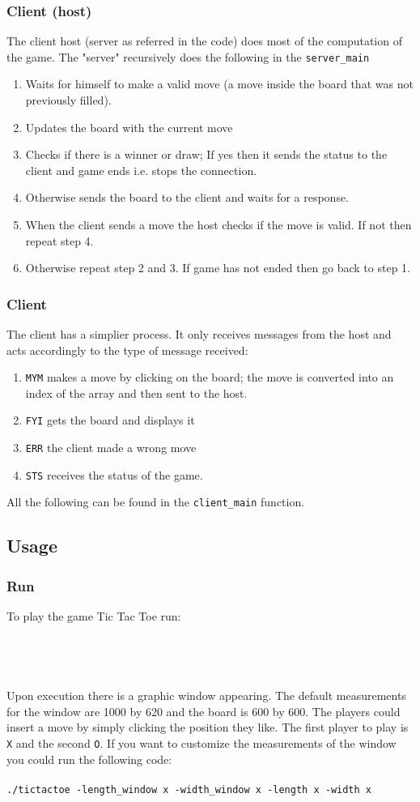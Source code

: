 \documentclass{article}
\begin{document}
\subsubsection{Client (host)}
The client host (server as referred in the code) does most of the computation of the game.  The "server" recursively does the following in the \texttt{server\_main}
\begin{enumerate}
\item Waits for himself to make a valid move (a move inside the board that was not previously filled).
\item Updates the board with the current move
\item Checks if there is a winner or draw; If yes then it sends the status to the client and game ends i.e. stops the connection.
\item Otherwise sends the board to the client and waits for a response.
\item When the client sends a move the host checks if the move is valid. If not then repeat step 4. 
\item Otherwise repeat step 2 and 3. If game has not ended then go back to step 1.
\end{enumerate}
\subsubsection{Client }
The client has a simplier process. It only receives messages from the host and acts accordingly to the type of message received:
\begin{enumerate}
\item \texttt{MYM} makes a move by clicking on the board; the move is converted into an index of the array and then sent to the host.
\item \texttt{FYI} gets the board and displays it
\item \texttt{ERR} the client made a wrong move
\item \texttt{STS} receives the status of the game. 
\end{enumerate}
All the following can be found in the \texttt{client\_main} function.
\subsection{Usage}
\subsubsection{Run}
To play the game Tic Tac Toe run:\\\\
\\
\\\\
Upon execution there is a graphic window appearing. The default measurements for the window are 1000 by 620 and the board is 600 by 600. The players could insert a move by simply clicking the position they like. The first player to play is \texttt{X} and the second \texttt{O}. If you want to customize the measurements of the window you could run the following code:\\\\
\texttt{./tictactoe -length\_window x -width\_window x -length x -width x}
  
\end{document}
